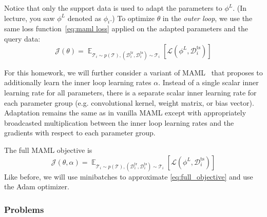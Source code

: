 \documentclass[12pt]{article}
\DeclareMathOperator{\E}{\mathbb{E}}
\newcommand{\task}{\mathcal{T}}
\newcommand{\supportdata}{\mathcal{D}^\mathrm{tr}}
\newcommand{\querydata}{\mathcal{D}^\mathrm{ts}}
\begin{document}
    Notice that only the support data is used to adapt the parameters to $\phi^L$. (In lecture, you saw $\phi^L$ denoted as $\phi_i$.) To optimize $\theta$ in the \emph{outer loop}, we use the same loss function~\eqref{eq:maml loss} applied on the adapted parameters and the query data:
    \begin{equation}
        \mathcal{J}(\theta) = \E_{\task_i \sim p(\task), (\supportdata_i, \querydata_i) \sim \task_i} \left[ \mathcal{L}(\phi^L, \querydata_i) \right] \label{eq:maml_objective}
    \end{equation}


    For this homework, we will further consider a variant of MAML~\cite{mamlplusplus} that proposes to additionally learn the inner loop learning rates $\alpha$. Instead of a single scalar inner learning rate for all parameters, there is a separate scalar inner learning rate for each parameter group (e.g. convolutional kernel, weight matrix, or bias vector). Adaptation remains the same as in vanilla MAML except with appropriately broadcasted multiplication between the inner loop learning rates and the gradients with respect to each parameter group.

    The full MAML objective is
    \begin{equation}
        \mathcal{J}(\theta, \alpha) = \E_{\task_i \sim p(\task), (\supportdata_i, \querydata_i) \sim \task_i} \left[ \mathcal{L}(\phi^L, \querydata_i) \right] \label{eq:full_objective}
    \end{equation}
    Like before, we will use minibatches to approximate \eqref{eq:full_objective} and use the Adam optimizer.

    \subsubsection*{Problems}
\end{document}
